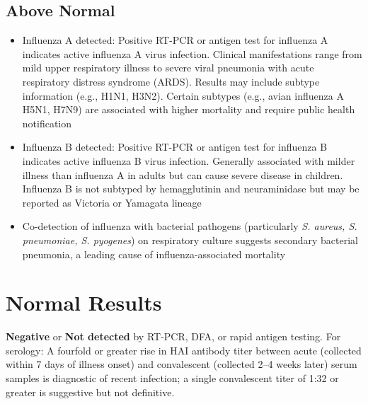 \subsection*{Above Normal}
\begin{itemize}
  \item Influenza A detected: Positive RT-PCR or antigen test for influenza A indicates active influenza A virus infection. Clinical manifestations range from mild upper respiratory illness to severe viral pneumonia with acute respiratory distress syndrome (ARDS). Results may include subtype information (e.g., H1N1, H3N2). Certain subtypes (e.g., avian influenza A H5N1, H7N9) are associated with higher mortality and require public health notification
  \item Influenza B detected: Positive RT-PCR or antigen test for influenza B indicates active influenza B virus infection. Generally associated with milder illness than influenza A in adults but can cause severe disease in children. Influenza B is not subtyped by hemagglutinin and neuraminidase but may be reported as Victoria or Yamagata lineage
  \item Co-detection of influenza with bacterial pathogens (particularly \textit{S. aureus, S. pneumoniae, S. pyogenes}) on respiratory culture suggests secondary bacterial pneumonia, a leading cause of influenza-associated mortality
\end{itemize}

\section*{Normal Results}
\textbf{Negative} or \textbf{Not detected} by RT-PCR, DFA, or rapid antigen testing. For serology: A fourfold or greater rise in HAI antibody titer between acute (collected within 7 days of illness onset) and convalescent (collected 2--4 weeks later) serum samples is diagnostic of recent infection; a single convalescent titer of 1:32 or greater is suggestive but not definitive.

